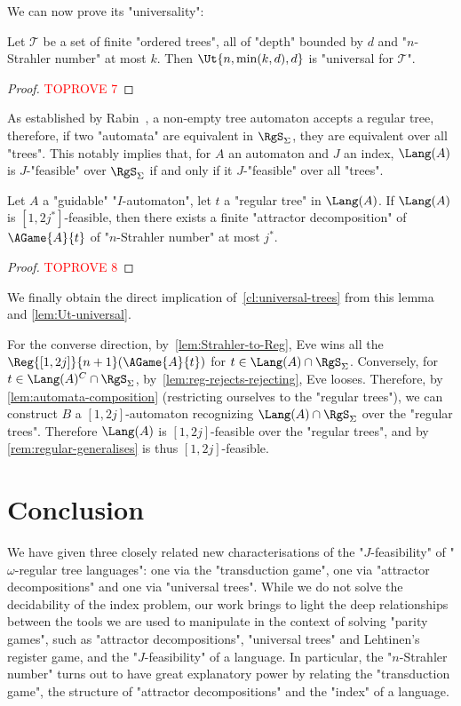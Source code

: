 \documentclass[a4paper,UKenglish,cleveref, autoref, thm-restate]{lipics-v2021}
\newcommand{\T}{\mathcal{T}}
\begin{document}
We can now prove its "universality":

\begin{lemma}\label{lem:Ut-universal}
Let $\T$ be a set of finite "ordered trees", all of "depth" bounded by $d$ and "$n$-Strahler number" at most $k$. Then $\Ut{n,\min(k,d),d}$ is "universal for $\T$".
\end{lemma}
\begin{proof}\textcolor{red}{TOPROVE 7}\end{proof}

\begin{remark}\label{rem:regular-generalises}
As established by Rabin~\cite[Theorem 20]{RabinRegular}, a non-empty tree automaton accepts a regular tree, therefore, if two "automata" are equivalent in $\RgS_\Sigma$, they are equivalent over all "trees". This notably implies that, for $A$ an automaton and $J$ an index, $\Lang(A)$ is $J$-"feasible" over $\RgS_\Sigma$ if and only if it $J$-"feasible" over all "trees".
\end{remark}

\begin{lemma}
	Let $A$ a "guidable" "$I$-automaton", let $t$ a "regular tree" in $\Lang(A)$. If $\Lang(A)$ is $[1,2j^*]$-feasible, then there exists a finite "attractor decomposition" of $\AGame{A}{t}$ of "$n$-Strahler number" at most $j^*$.
\end{lemma}
\begin{proof}\textcolor{red}{TOPROVE 8}\end{proof}

We finally obtain the direct implication of~\cref{cl:universal-trees} from this lemma and \cref{lem:Ut-universal}.

For the converse direction, by~\cref{lem:Strahler-to-Reg}, Eve wins all the $\Reg{[1,2j]}{n+1}(\AGame{A}{t})$ for $t\in \Lang(A)\cap \RgS_\Sigma$. Conversely, for $t \in \Lang(A)^C \cap \RgS_\Sigma$, by~\cref{lem:reg-rejects-rejecting}, Eve looses. Therefore, by \cref{lem:automata-composition} (restricting ourselves to the "regular trees"), we can construct $B$ a $[1,2j]$-automaton recognizing $\Lang(A)\cap\RgS_\Sigma$ over the "regular trees". Therefore $\Lang(A)$ is $[1,2j]$-feasible over the "regular trees", and by~ \cref{rem:regular-generalises} is thus $[1,2j]$-feasible. 
\section{Conclusion}
We have given three closely related new characterisations of the "$J$-feasibility" of "$\omega$-regular tree languages": one via the "transduction game", one via "attractor decompositions" and one via "universal trees". While we do not solve the decidability of the index problem, our work brings to light the deep relationships between the tools we are used to manipulate in the context of solving "parity games", such as "attractor decompositions", "universal trees" and Lehtinen's register game, and the "$J$-feasibility" of a language.  In particular, the "$n$-Strahler number" turns out to have great explanatory power by relating the "transduction game", the structure of "attractor decompositions" and the "index" of a language. 
\end{document}
